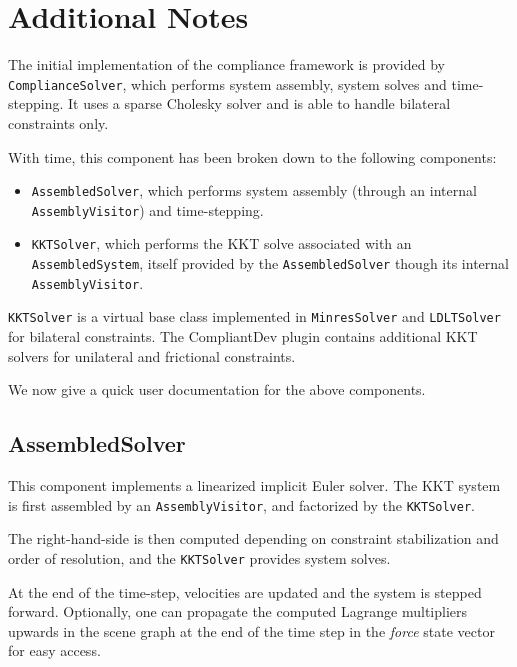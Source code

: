 \section{Additional Notes}
\label{sec:additional notes}

\newcommand{\component}[1]{\texttt{#1}}
\newcommand{\compopt}[2]{\texttt{#1}=''#2''\\}

The initial implementation of the compliance framework is provided by
\component{ComplianceSolver}, which performs system assembly, system
solves and time-stepping. It uses a sparse Cholesky solver and is able
to handle bilateral constraints only.

With time, this component has been broken down to the following
components:

\begin{itemize}
\item \component{AssembledSolver}, which performs system assembly
  (through an internal \component{AssemblyVisitor}) and
  time-stepping.
\item \component{KKTSolver}, which performs the KKT solve associated
  with an \component{AssembledSystem}, itself provided by the
  \component{AssembledSolver} though its internal
  \component{AssemblyVisitor}. 
\end{itemize}

\component{KKTSolver} is a virtual base class implemented in
\component{MinresSolver} and \component{LDLTSolver} for bilateral
constraints. The CompliantDev plugin contains additional KKT solvers
for unilateral and frictional constraints.

We now give a quick user documentation for the above components.

\subsection{AssembledSolver}

This component implements a linearized implicit Euler solver. The KKT
system is first assembled by an \component{AssemblyVisitor}, and
factorized by the \component{KKTSolver}.

The right-hand-side is then computed depending on constraint
stabilization and order of resolution, and the \component{KKTSolver}
provides system solves.

At the end of the time-step, velocities are updated and the system is
stepped forward. Optionally, one can propagate the computed Lagrange
multipliers upwards in the scene graph at the end of the time step in
the \emph{force} state vector for easy access.

